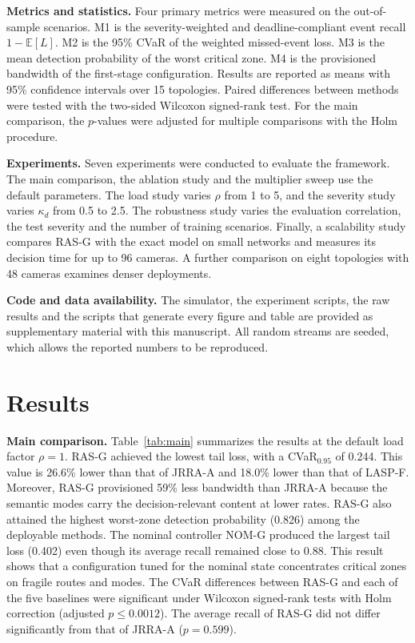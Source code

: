 \documentclass[letterpaper,journal]{IEEEtran}
\begin{document}
\textbf{Metrics and statistics.} Four primary metrics were measured on the out-of-sample scenarios. M1 is the severity-weighted and deadline-compliant event recall $1-\mathbb E[L]$. M2 is the 95\% CVaR of the weighted missed-event loss. M3 is the mean detection probability of the worst critical zone. M4 is the provisioned bandwidth of the first-stage configuration. Results are reported as means with 95\% confidence intervals over 15 topologies. Paired differences between methods were tested with the two-sided Wilcoxon signed-rank test. For the main comparison, the $p$-values were adjusted for multiple comparisons with the Holm procedure.

\textbf{Experiments.} Seven experiments were conducted to evaluate the framework. The main comparison, the ablation study and the multiplier sweep use the default parameters. The load study varies $\rho$ from 1 to 5, and the severity study varies $\kappa_d$ from 0.5 to 2.5. The robustness study varies the evaluation correlation, the test severity and the number of training scenarios. Finally, a scalability study compares RAS-G with the exact model on small networks and measures its decision time for up to 96 cameras. A further comparison on eight topologies with 48 cameras examines denser deployments.

\textbf{Code and data availability.} The simulator, the experiment scripts, the raw results and the scripts that generate every figure and table are provided as supplementary material with this manuscript. All random streams are seeded, which allows the reported numbers to be reproduced.

\section{Results}
\textbf{Main comparison.} Table~\ref{tab:main} summarizes the results at the default load factor $\rho=1$. RAS-G achieved the lowest tail loss, with a CVaR$_{0.95}$ of 0.244. This value is 26.6\% lower than that of JRRA-A and 18.0\% lower than that of LASP-F. Moreover, RAS-G provisioned 59\% less bandwidth than JRRA-A because the semantic modes carry the decision-relevant content at lower rates. RAS-G also attained the highest worst-zone detection probability (0.826) among the deployable methods. The nominal controller NOM-G produced the largest tail loss (0.402) even though its average recall remained close to 0.88. This result shows that a configuration tuned for the nominal state concentrates critical zones on fragile routes and modes. The CVaR differences between RAS-G and each of the five baselines were significant under Wilcoxon signed-rank tests with Holm correction (adjusted $p\le0.0012$). The average recall of RAS-G did not differ significantly from that of JRRA-A ($p=0.599$).
\end{document}
